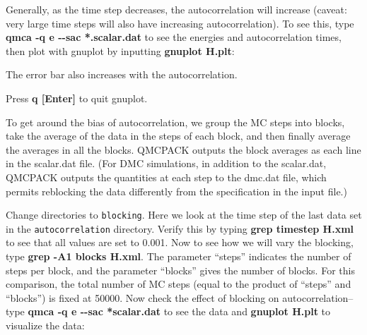 Generally, as the time step decreases, the autocorrelation will increase
(caveat: very large time steps will also have increasing autocorrelation). To
see this, type \textbf{qmca -q e {-}{-}sac *.scalar.dat} to see the energies
and autocorrelation times, then plot with gnuplot by inputting \textbf{gnuplot
H.plt}:


The error bar also increases with the autocorrelation.  

Press \textbf{q [Enter]} to quit gnuplot.

To get around the bias of autocorrelation, we group the MC steps into blocks,
take the average of the data in the steps of each block, and then finally
average the averages in all the blocks.  QMCPACK outputs the block averages as
each line in the scalar.dat file.  (For DMC simulations, in addition to the
scalar.dat, QMCPACK outputs the quantities at each step to the dmc.dat file,
which permits reblocking the data differently from the specification in the
input file.) 

Change directories to \texttt{blocking}.  Here we look at the time step of the
last data set in the \texttt{autocorrelation} directory.  Verify this by typing
\textbf{grep timestep H.xml} to see that all values are set to 0.001.  Now to
see how we will vary the blocking, type \textbf{grep -A1 blocks H.xml}.  The
parameter ``steps'' indicates the number of steps per block, and the parameter
``blocks'' gives the number of blocks.  For this comparison, the total number
of MC steps (equal to the product of ``steps'' and ``blocks'') is fixed at
50000.  Now check the effect of blocking on autocorrelation--type \textbf{qmca
-q e {-}{-}sac *scalar.dat} to see the data and \textbf{gnuplot H.plt} to
visualize the data:


